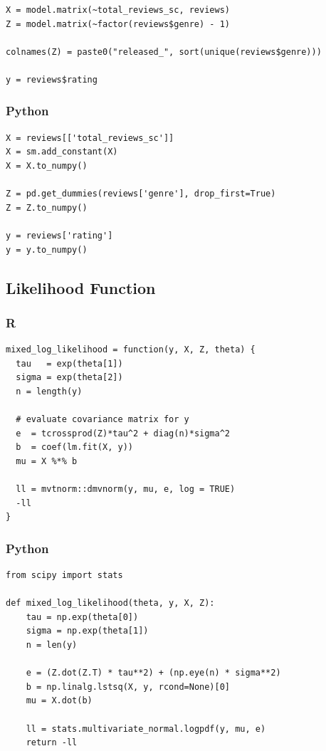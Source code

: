 \documentclass[
  letterpaper,
]{krantz}
\begin{document}
\begin{verbatim}
X = model.matrix(~total_reviews_sc, reviews)
Z = model.matrix(~factor(reviews$genre) - 1)

colnames(Z) = paste0("released_", sort(unique(reviews$genre)))

y = reviews$rating
\end{verbatim}

\subsubsection{Python}

\begin{verbatim}
X = reviews[['total_reviews_sc']]
X = sm.add_constant(X)
X = X.to_numpy()

Z = pd.get_dummies(reviews['genre'], drop_first=True)
Z = Z.to_numpy()

y = reviews['rating']
y = y.to_numpy()
\end{verbatim}

\subsection{Likelihood Function}\label{likelihood-function}

\subsubsection{R}

\begin{verbatim}
mixed_log_likelihood = function(y, X, Z, theta) {
  tau   = exp(theta[1])
  sigma = exp(theta[2])
  n = length(y)
  
  # evaluate covariance matrix for y
  e  = tcrossprod(Z)*tau^2 + diag(n)*sigma^2
  b  = coef(lm.fit(X, y))
  mu = X %*% b

  ll = mvtnorm::dmvnorm(y, mu, e, log = TRUE)
  -ll
}
\end{verbatim}

\subsubsection{Python}

\begin{verbatim}
from scipy import stats

def mixed_log_likelihood(theta, y, X, Z):
    tau = np.exp(theta[0])
    sigma = np.exp(theta[1])
    n = len(y)
    
    e = (Z.dot(Z.T) * tau**2) + (np.eye(n) * sigma**2)
    b = np.linalg.lstsq(X, y, rcond=None)[0]
    mu = X.dot(b) 
    
    ll = stats.multivariate_normal.logpdf(y, mu, e)
    return -ll
\end{verbatim}
\end{document}
